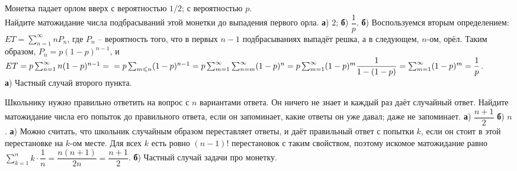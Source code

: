 \documentclass[a4paper,11pt]{article}
\begin{document}
Монетка падает орлом вверх
 с вероятностью $1/2$;
 с вероятностью $p$. %
\\Найдите матожидание числа подбрасываний этой монетки до выпадения первого орла.
\textbf{а}) $2$; \textbf{б}) $\dfrac{1}{p}$.
\textbf{б}) Воспользуемся вторым определением: $E T = \sum_{n=1}^{\infty} n P_n$, где $P_n$ -- вероятность того, что в первых $n-1$ подбрасываниях выпадёт решка, а в следующем, $n$-ом, орёл. Таким образом, $P_n = p(1-p)^{n-1}$, и $ET= p \sum_{n=1}^{\infty} n(1-p)^{n-1} = \\ = p \sum_{m \leq n} (1-p)^{n-1} = p \sum_{m=1}^{\infty} \sum_{n=m}^{\infty} (1-p)^n = p \sum_{m=1}^{\infty} (1-p)^m \dfrac{1}{1-(1-p)} = \sum_{m=1}^{\infty} (1-p)^{m} = \dfrac{1}{p}$.
\\\textbf{а}) Частный случай второго пункта.











Школьнику нужно правильно ответить на вопрос с $n$ вариантами ответа.
Он ничего не знает и каждый раз даёт случайный ответ.
Найдите матожидание числа его попыток до правильного ответа, если он
 запоминает, какие ответы он уже давал;
 даже не запоминает.
\textbf{а}) $\dfrac{n+1}{2}$ \textbf{б}) $n$.
\textbf{а}) Можно считать, что школьник случайным образом переставляет ответы, и даёт правильный ответ с попытки $k$, если он стоит в этой перестановке на $k$-ом месте. Для всех $k$ есть ровно $(n-1)!$ перестановок с таким свойством, поэтому искомое матожидание равно $\sum_{k=1}^n k \cdot \dfrac{1}{n} = \dfrac{n(n+1)}{2n} = \dfrac{n+1}{2}$.
\textbf{б}) Частный случай задачи про монетку.














%
%
%
%
%
%
\end{document}

